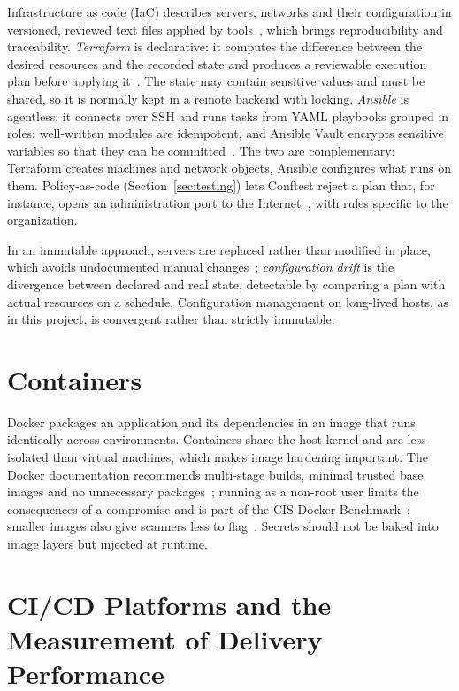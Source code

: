 Infrastructure as code (IaC) describes servers, networks and their configuration in versioned, reviewed text files applied by tools~\cite{morris2020}, which brings reproducibility and traceability. \emph{Terraform} is declarative: it computes the difference between the desired resources and the recorded state and produces a reviewable execution plan before applying it~\cite{terraform}. The state may contain sensitive values and must be shared, so it is normally kept in a remote backend with locking. \emph{Ansible} is agentless: it connects over SSH and runs tasks from YAML playbooks grouped in roles; well-written modules are idempotent, and Ansible Vault encrypts sensitive variables so that they can be committed~\cite{ansible-docs}. The two are complementary: Terraform creates machines and network objects, Ansible configures what runs on them. Policy-as-code (Section~\ref{sec:testing}) lets Conftest reject a plan that, for instance, opens an administration port to the Internet~\cite{opa,conftest}, with rules specific to the organization.

In an immutable approach, servers are replaced rather than modified in place, which avoids undocumented manual changes~\cite{morris2020}; \emph{configuration drift} is the divergence between declared and real state, detectable by comparing a plan with actual resources on a schedule. Configuration management on long-lived hosts, as in this project, is convergent rather than strictly immutable.

\section{Containers}
\label{sec:containers}

Docker packages an application and its dependencies in an image that runs identically across environments. Containers share the host kernel and are less isolated than virtual machines, which makes image hardening important. The Docker documentation recommends multi-stage builds, minimal trusted base images and no unnecessary packages~\cite{docker-best-practices}; running as a non-root user limits the consequences of a compromise and is part of the CIS Docker Benchmark~\cite{cis-benchmarks}; smaller images also give scanners less to flag~\cite{trivy}. Secrets should not be baked into image layers but injected at runtime.

\section{CI/CD Platforms and the Measurement of Delivery Performance}
\label{sec:cicd}

